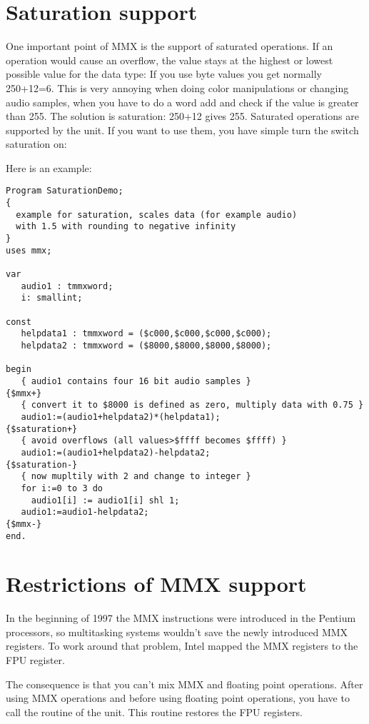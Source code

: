 \section{Saturation support}
\label{se:SaturationSupport}

One important point of MMX is the support of saturated operations.
If an operation would cause an overflow, the value stays at the
highest or lowest possible value for the data type:
If you use byte values you get normally 250+12=6. This is very
annoying when doing color manipulations or changing audio samples,
when you have to do a word add and check if the value is greater than
255. The solution is saturation: 250+12 gives 255.
Saturated operations are supported by the  unit. If you
want to use them, you have simple turn the switch saturation on:

Here is an example:
\begin{verbatim}
Program SaturationDemo;
{
  example for saturation, scales data (for example audio)
  with 1.5 with rounding to negative infinity
}
uses mmx;

var
   audio1 : tmmxword;
   i: smallint;

const
   helpdata1 : tmmxword = ($c000,$c000,$c000,$c000);
   helpdata2 : tmmxword = ($8000,$8000,$8000,$8000);

begin
   { audio1 contains four 16 bit audio samples }
{$mmx+}
   { convert it to $8000 is defined as zero, multiply data with 0.75 }
   audio1:=(audio1+helpdata2)*(helpdata1);
{$saturation+}
   { avoid overflows (all values>$ffff becomes $ffff) }
   audio1:=(audio1+helpdata2)-helpdata2;
{$saturation-}
   { now mupltily with 2 and change to integer }
   for i:=0 to 3 do
     audio1[i] := audio1[i] shl 1;
   audio1:=audio1-helpdata2;
{$mmx-}
end.
\end{verbatim}

\section{Restrictions of MMX support}
\label{se:MMXrestrictions}

In the beginning of 1997 the MMX instructions were introduced in the
Pentium processors, so multitasking systems wouldn't save the
newly introduced MMX registers. To work around that problem, Intel
mapped the MMX registers to the FPU register.

The consequence is that
you can't mix MMX and floating point operations. After using
MMX operations and before using floating point operations, you
have to call the routine  of the  unit.
This routine restores the FPU registers.


